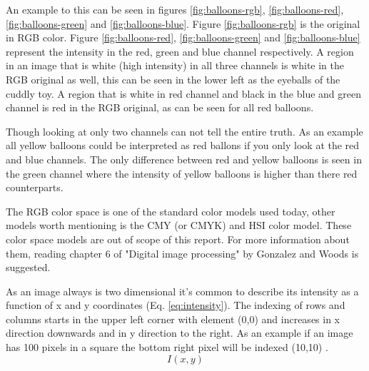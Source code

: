 An example to this can be seen in figures \ref{fig:balloons-rgb},
\ref{fig:balloons-red}, \ref{fig:balloons-green} and \ref{fig:balloons-blue}.
Figure \ref{fig:balloons-rgb} is the original in RGB color. Figure \ref{fig:balloons-red},
\ref{fig:balloons-green} and \ref{fig:balloons-blue} represent the intensity in the red,
green and blue channel respectively. A region in an image that is white (high
intensity) in all three channels is white in the RGB original as well, this can
be seen in the lower left as the eyeballs of the cuddly toy. A region that is white
in red channel and black in the blue and green channel is red in the RGB original, as
can be seen for all red balloons.

Though looking at only two channels can not tell the entire truth. As an example all
yellow balloons could be interpreted as red ballons if you only look at the
red and blue channels. The only difference between red and yellow balloons is
seen in the green channel where the intensity of yellow balloons is higher than
there red counterparts.

The RGB color space is one of the standard color models used today, other models
worth mentioning is the CMY (or CMYK) and HSI color model. These color space
models are out of scope of this report. For more information about them,
reading chapter 6 of "Digital image processing" by Gonzalez and Woods \cite{gonzalez2008} is suggested.

As an image always is two dimensional it's common to describe its intensity as
a function of x and y coordinates (Eq. \ref{eq:intensity}). The indexing of
rows and columns starts in the upper left corner with element (0,0) and increases
in x direction downwards and in y direction to the right. As an example if an
image has 100 pixels in a square the bottom right pixel will be indexed (10,10) \cite[p. 56]{gonzalez2008}.
\begin{equation}
    \label{eq:intensity}
    I(x,y)
\end{equation}

